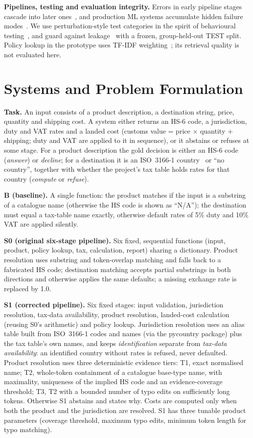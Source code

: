 \documentclass[conference]{IEEEtran}
\begin{document}
\textbf{Pipelines, testing and evaluation integrity.} Errors in early pipeline stages cascade into later
ones~\cite{finkel2006}, and production ML systems accumulate hidden failure modes~\cite{sculley2015, breck2017}. We use
perturbation-style test categories in the spirit of behavioural testing~\cite{ribeiro2020}, and guard against
leakage~\cite{kapoor2023} with a frozen, group-held-out TEST split. Policy lookup in the prototype uses TF-IDF
weighting~\cite{salton1988}; its retrieval quality is not evaluated here.

\section{Systems and Problem Formulation}
\textbf{Task.} An input consists of a product description, a destination string, price, quantity and shipping cost. A
system either returns an HS-6 code, a jurisdiction, duty and VAT rates and a landed cost (customs value = price
$\times$ quantity + shipping; duty and VAT are applied to it in sequence), or it abstains or refuses at some stage. For a
product description the gold decision is either an HS-6 code (\emph{answer}) or \emph{decline}; for a destination it is
an ISO~3166-1 country~\cite{iso3166} or ``no country'', together with whether the project's tax table holds rates for that
country (\emph{compute} or \emph{refuse}).

\textbf{B (baseline).} A single function: the product matches if the input is a substring of a catalogue name (otherwise
the HS code is shown as ``N/A''); the destination must equal a tax-table name exactly, otherwise default rates of 5\% duty
and 10\% VAT are applied silently.

\textbf{S0 (original six-stage pipeline).} Six fixed, sequential functions (input, product, policy lookup, tax,
calculation, report) sharing a dictionary. Product resolution uses substring and token-overlap matching and falls back
to a fabricated HS code; destination matching accepts partial substrings in both directions and otherwise applies the
same defaults; a missing exchange rate is replaced by 1.0.

\textbf{S1 (corrected pipeline).} Six fixed stages: input validation, jurisdiction resolution, tax-data availability,
product resolution, landed-cost calculation (reusing S0's arithmetic) and policy lookup. Jurisdiction resolution uses an
alias table built from ISO~3166-1 codes and names (via the pycountry package) plus the tax table's own names, and keeps
\emph{identification} separate from \emph{tax-data availability}: an identified country without rates is refused, never
defaulted. Product resolution uses three deterministic evidence tiers: T1, exact normalised name; T2, whole-token
containment of a catalogue base-type name, with maximality, uniqueness of the implied HS code and an evidence-coverage
threshold; T3, T2 with a bounded number of typo edits on sufficiently long tokens. Otherwise S1 abstains and states why.
Costs are computed only when both the product and the jurisdiction are resolved. S1 has three tunable product
parameters (coverage threshold, maximum typo edits, minimum token length for typo matching).
\end{document}
